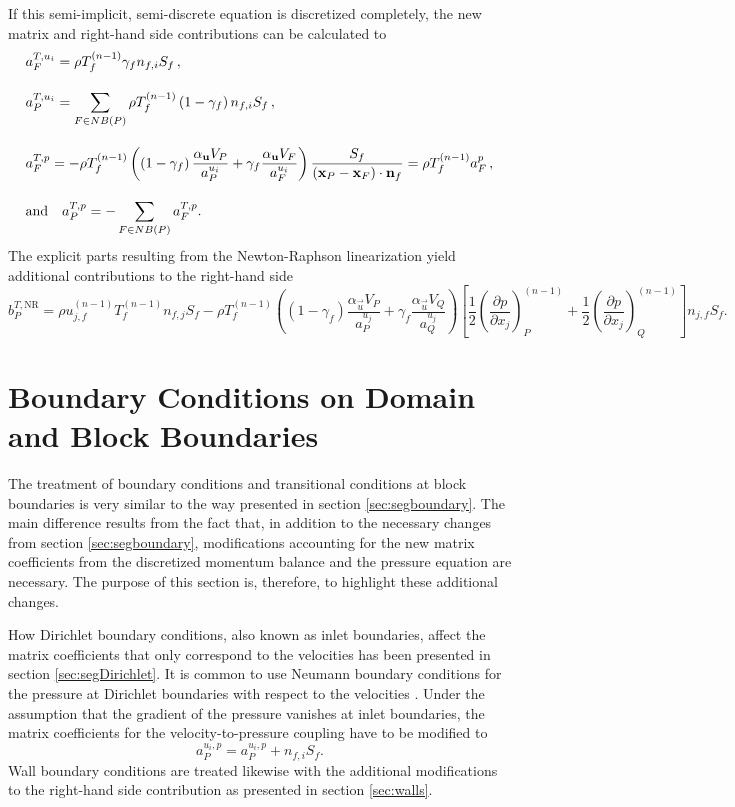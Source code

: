 If this semi-implicit, semi-discrete equation is discretized completely, the new matrix and right-hand side contributions can be calculated to
\begin{align*}
  \allowdisplaybreaks
  &a_F^{T,u_i} = \rho T_f^{(n-1)} \gamma_f n_{f,i} S_f \,, \\[1.0em] 
  &a_P^{T,u_i} = \sum_{F \in NB(P)} \rho T_f^{(n-1)} \left(1-\gamma_f\right) n_{f,i} S_f \,, \\[1.0em]
  &a_F^{T,p} = -\rho T_f^{(n-1)} \left(\left(1 - \gamma_f\right) \frac{\alpha_\vec{u} V_P}{a_P^{u_i}} + \gamma_f \frac{\alpha_\vec{u} V_F}{a_F^{u_i}}\right) \frac{S_f}{\left(\vec{x}_P - \vec{x}_F\right) \cdot \vec{n}_f} = \rho T_f^{(n-1)} a_F^{p} \,, \\[1.0em] 
  &\text{and} \quad
  a_P^{T,p} = - \sum_{F \in NB(P)} a_F^{T,p}.
\end{align*}
The explicit parts resulting from the Newton-Raphson linearization yield additional contributions to the right-hand side
\begin{displaymath}
  b_P^{T,\text{NR}} 
  = 
  \rho u_{j,f}^{(n-1)} T_f^{(n-1)} n_{f,j} S_f 
  - \rho T_f^{(n-1)} \left(\left(1 - \gamma_f\right) \frac{\alpha_\vec{u} V_P}{a_P^{u_j}} + \gamma_f \frac{\alpha_\vec{u} V_Q}{a_Q^{u_j}}\right)
    \left[ 
    \frac{1}{2} \left( \frac{\partial p}{\partial x_j} \right)_P^{(n-1)} 
    + \frac{1}{2} \left(\frac{\partial p}{\partial x_j}\right)_Q^{(n-1)} 
    \right] n_{j,f} S_f.
\end{displaymath}

\section{Boundary Conditions on Domain and Block Boundaries}

The treatment of boundary conditions and transitional conditions at block boundaries is very similar to the way presented in section \ref{sec:segboundary}. The main difference results from the fact that, in addition to the necessary changes from section \ref{sec:segboundary}, modifications accounting for the new matrix coefficients from the discretized momentum balance and the pressure equation are necessary. The purpose of this section is, therefore, to highlight these additional changes.

How Dirichlet boundary conditions, also known as inlet boundaries, affect the matrix coefficients that only correspond to the velocities has been presented in section \ref{sec:segDirichlet}. It is common to use Neumann boundary conditions for the pressure at Dirichlet boundaries with respect to the velocities \cite{darwish09}. Under the assumption that the gradient of the pressure vanishes at inlet boundaries, the matrix coefficients for the velocity-to-pressure coupling have to be modified to 
\begin{displaymath}
  a_P^{u_i,p} = a_P^{u_i,p} + n_{f,i} S_f.
\end{displaymath}
Wall boundary conditions are treated likewise with the additional modifications to the right-hand side contribution as presented in section \ref{sec:walls}.


